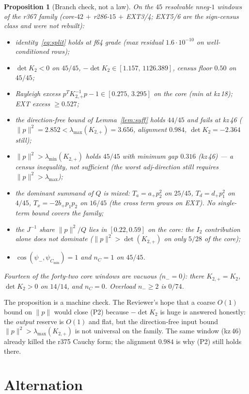 \documentclass[11pt]{article}
\newtheorem{prop}{Proposition}
\theoremstyle{remark}
\newcommand{\psim}{\psi_{-}}
\newcommand{\Kp}{K_{2,+}}
\begin{document}
\begin{prop}[Branch check, not a law]\label{prop:anatomy}
On the $45$ resolvable nneg-$1$ windows of the r367 family
(core-$42$ $+$ r286-$15$ $+$ EXT3/4; EXT5/6 are the sign-census
class and were not rebuilt):
\begin{itemize}
\item
identity~\eqref{eq:split} holds at f64 grade
(max residual $1.6\cdot 10^{-10}$ on well-conditioned rows);
\item
$\det K_{2}<0$ on $45/45$, $-\det K_{2}\in[1.157,\,1126.389]$,
census floor $0.50$ on $45/45$;
\item
Rayleigh excess $p^{T}\Kp^{-1}p-1\in[0.275,\,3.295]$ on the
core (min at kz\,18); EXT excess $\ge 0.527$;
\item
the direction-free bound of Lemma~\ref{lem:suff} holds
$44/45$ and \emph{fails} at kz\,46
($\|p\|^{2}=2.852<\lambda_{\max}(\Kp)=3.656$, alignment
$0.984$, $\det K_{2}=-2.364$ still);
\item
$\|p\|^{2}>\lambda_{\min}(\Kp)$ holds $45/45$ with minimum gap
$0.316$ (kz\,46) --- a census inequality, \emph{not} sufficient
(the worst adj-direction still requires $\|p\|^{2}>\lambda_{\max}$);
\item
the dominant summand of $Q$ is mixed:
$T_{a}=a_{+}p_{2}^{2}$ on $25/45$,
$T_{d}=d_{+}p_{1}^{2}$ on $4/45$,
$T_{x}=-2b_{+}p_{1}p_{2}$ on $16/45$ (the cross term grows on
EXT).  No single-term bound covers the family;
\item
the $J^{-1}$ share $\|p\|^{2}/Q$ lies in $[0.22,0.59]$ on the
core: the $I_{2}$ contribution alone does not dominate
($\|p\|^{2}>\det(\Kp)$ on only $5/28$ of the core);
\item
$\cos(\psim,\psi_{C_{\min}})=1$ and $n_{C}=1$ on $45/45$.
\end{itemize}
Fourteen of the forty-two core windows are vacuous
($n_{-}=0$): there $\Kp=K_{2}$, $\det K_{2}>0$ on $14/14$,
and $n_{C}=0$.  Overload $n_{-}\ge 2$ is $0/74$.
\end{prop}

The proposition is a machine check.  The Reviewer's hope that a
coarse $O(1)$ bound on $\|p\|$ would close (P2) because
$-\det K_{2}$ is huge is answered honestly: the \emph{output}
reserve is $O(1)$ and flat, but the direction-free input bound
$\|p\|^{2}>\lambda_{\max}(\Kp)$ is not universal on the family.
The same window (kz\,46) already killed the r375 Cauchy form; the
alignment $0.984$ is why (P2) still holds there.

\section{Alternation}\label{sec:alt}
\end{document}
